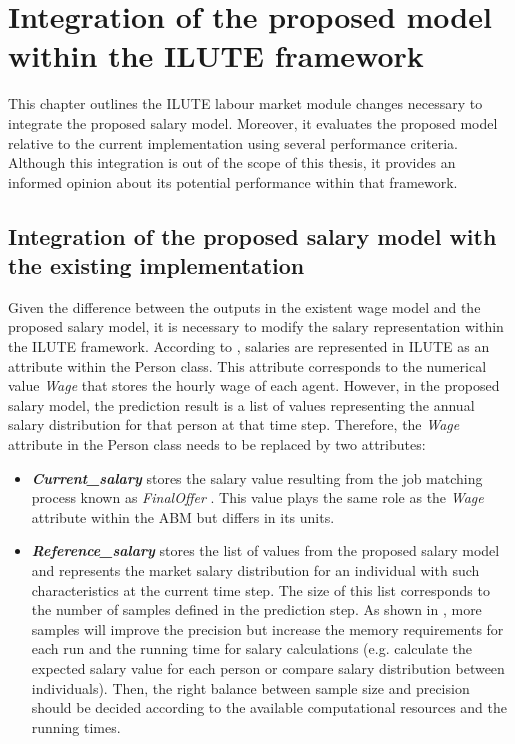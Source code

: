 \chapter{Integration of the proposed model within the ILUTE framework }

This chapter outlines the ILUTE labour market module changes necessary to integrate the proposed salary model. Moreover, it evaluates the proposed model relative to the current implementation using several performance criteria. Although this integration is out of the scope of this thesis, it provides an informed opinion about its potential performance within that framework. 

\section{Integration of the proposed salary model with the existing implementation }

Given the difference between the outputs in the existent wage model and the proposed salary model, it is necessary to modify the salary representation within the ILUTE framework. According to \citet{Harmon2013}, salaries are represented in ILUTE as an attribute within the Person class. This attribute corresponds to the numerical value \textit{Wage} that stores the hourly wage of each agent. However, in the proposed salary model, the prediction result is a list of values representing the annual salary distribution for that person at that time step. Therefore, the \textit{Wage} attribute in the Person class needs to be replaced by two attributes: 

\begin{itemize}
    \item \textit{\textbf{Current\_salary}} stores the salary value resulting from the job matching process known as \textit{FinalOffer} \citep{Harmon2013}. This value plays the same role as the \textit{Wage} attribute within the ABM but differs in its units.
    \item \textit{\textbf{Reference\_salary}} stores the list of values from the proposed salary model and represents the market salary distribution for an individual with such characteristics at the current time step. The size of this list corresponds to the number of samples defined in the prediction step. As shown in , more samples will improve the precision but increase the memory requirements for each run and the running time for salary calculations (e.g. calculate the expected salary value for each person or compare salary distribution between individuals). Then, the right balance between sample size and precision should be decided according to the available computational resources and the running times. 
\end{itemize}


